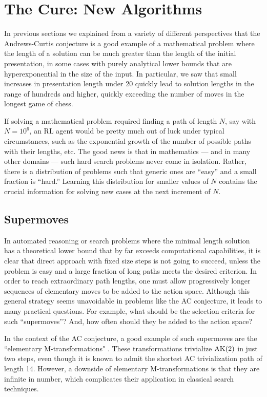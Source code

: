 \section{The Cure: New Algorithms}\label{sec:algo}

In previous sections we explained from a variety of different perspectives that the Andrews-Curtis conjecture is a good example of a mathematical problem where the length of a solution can be much greater than the length of the initial presentation, in some cases with purely analytical lower bounds that are hyperexponential in the size of the input. In particular, we saw that small increases in presentation length under 20 quickly lead to solution lengths in the range of hundreds and higher, quickly exceeding the number of moves in the longest game of chess.

If solving a mathematical problem required finding a path of length $N$, say with $N=10^6$, an RL agent would be pretty much out of luck under typical circumstances, such as the exponential growth of the number of possible paths with their lengths, etc. The good news is that in mathematics --- and in many other domains --- such hard search problems never come in isolation. Rather, there is a distribution of problems such that generic ones are ``easy'' and a small fraction is ``hard.'' Learning this distribution for smaller values of $N$ contains the crucial information for solving new cases at the next increment of $N$.

\subsection{Supermoves}

In automated reasoning or search problems where the minimal length solution has a theoretical lower bound that by far exceeds computational capabilities, it is clear that direct approach with fixed size steps is not going to succeed, unless the problem is easy and a large fraction of long paths meets the desired criterion. In order to reach extraordinary path lengths, one must allow progressively longer sequences of elementary moves to be added to the action space. Although this general strategy seems unavoidable in problems like the AC conjecture, it leads to many practical questions. For example, what should be the selection criteria for such ``supermoves''? And, how often should they be added to the action space?

In the context of the AC conjecture, a good example of such supermoves are the ``elementary M-transformations" \cite{BurnsI, BurnsII}. These transformations trivialize $\text{AK}(2)$ in just two steps, even though it is known to admit the shortest AC trivialization path of length 14.
However, a downside of elementary M-transformations is that they are infinite in number, which complicates their application in classical search techniques.

